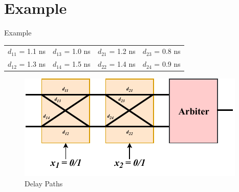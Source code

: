 \documentclass[10pt, compress]{beamer}
\begin{document}
\section{Example}


\begin{frame}{Example}
    \begin{table}[H]
        \centering
        \begin{tabular}{cccc}
        $d_{11}$ = 1.1 ns & $d_{13}$ = 1.0 ns & $d_{21}$ = 1.2 ns & $d_{23}$ = 0.8 ns\\
        $d_{12}$ = 1.3 ns & $d_{14}$ = 1.5 ns & $d_{22}$ = 1.4 ns & $d_{24}$ = 0.9 ns\\
        \end{tabular}
    \end{table}
    \begin{figure}
        \centering
        \includegraphics[width=\textwidth]{figures/2_switch_blocks_paths.pdf}
        \caption{Delay Paths}
    \end{figure}
\end{frame}
\end{document}

